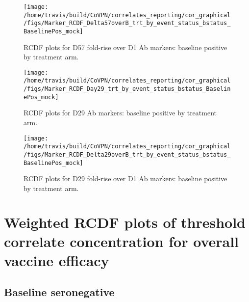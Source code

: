 \documentclass[]{book}
\theoremstyle{definition}
\theoremstyle{definition}
\theoremstyle{definition}
\newcommand{\1}{\mathbbm{1}}
\begin{document}
\clearpage
\begin{figure}[H]

{\centering \texttt{[image: /home/travis/build/CoVPN/correlates\_reporting/cor\_graphical/figs/Marker\_RCDF\_Delta57overB\_trt\_by\_event\_status\_bstatus\_BaselinePos\_mock]} 

}

\caption{RCDF plots for D57 fold-rise over D1 Ab markers: baseline positive by treatment arm.}\label{fig:unnamed-chunk-18}
\end{figure}

\clearpage
\begin{figure}[H]

{\centering \texttt{[image: /home/travis/build/CoVPN/correlates\_reporting/cor\_graphical/figs/Marker\_RCDF\_Day29\_trt\_by\_event\_status\_bstatus\_BaselinePos\_mock]} 

}

\caption{RCDF plots for D29 Ab markers: baseline positive by treatment arm.}\label{fig:unnamed-chunk-19}
\end{figure}

\clearpage
\begin{figure}[H]

{\centering \texttt{[image: /home/travis/build/CoVPN/correlates\_reporting/cor\_graphical/figs/Marker\_RCDF\_Delta29overB\_trt\_by\_event\_status\_bstatus\_BaselinePos\_mock]} 

}

\caption{RCDF plots for D29 fold-rise over D1 Ab markers: baseline positive by treatment arm.}\label{fig:unnamed-chunk-20}
\end{figure}

\clearpage

\hypertarget{weighted-rcdf-plots-of-threshold-correlate-concentration-for-overall-vaccine-efficacy}{%
\section{Weighted RCDF plots of threshold correlate concentration for overall vaccine efficacy}\label{weighted-rcdf-plots-of-threshold-correlate-concentration-for-overall-vaccine-efficacy}}

\hypertarget{baseline-seronegative-2}{%
\subsection{Baseline seronegative}\label{baseline-seronegative-2}}
\end{document}
